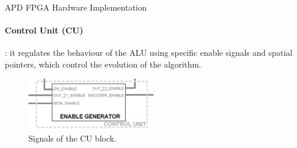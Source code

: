 \documentclass{beamer}
\begin{document}
\begin{frame}{APD FPGA Hardware Implementation}
    \framesubtitle{Control Unit (CU)}
    \alert{} : it regulates the behaviour of the ALU using specific enable signals and spatial pointers, which control the evolution of the algorithm.
    \vspace{1cm}
    \begin{figure}
        \includegraphics[width=0.5\textwidth]{Images_Rocco/CU.png}
        \caption{Signals of the CU block.}
        \label{fig:AR_CU_time_evolution}
    \end{figure}
\end{frame}
\end{document}
